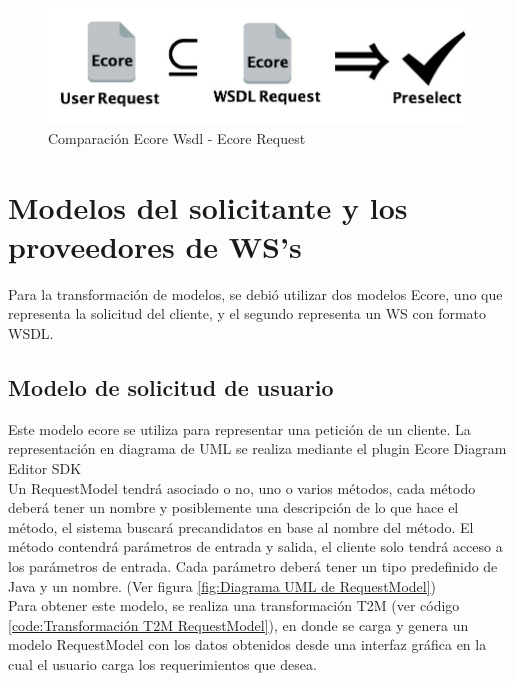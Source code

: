 \begin{figure}[!h] 
	\begin{center}
		\includegraphics [scale=0.45]{imagenes/Comparacion_Ecore_Wsdl.jpg}
	\end{center}
	\caption{Comparación Ecore Wsdl - Ecore Request}
	\label{fig:Comparación Ecore Wsdl - Ecore Request}
\end{figure} 

\section{Modelos del solicitante y los proveedores de WS's}
\label{Modelos del solicitante y los proveedores de WS's}

Para la transformación de modelos, se debió utilizar dos modelos Ecore, uno que representa la solicitud del cliente, y el segundo representa un WS con formato WSDL.

\subsection{Modelo de solicitud de usuario}
\label{Modelo de solicitud de usuario}

Este modelo ecore se utiliza para representar una petición  de un cliente. La representación en diagrama de UML se realiza mediante el plugin Ecore Diagram Editor SDK\\

Un RequestModel tendrá asociado o no, uno o varios métodos, cada método deberá tener un nombre y posiblemente una descripción de lo que hace el método, el sistema buscará precandidatos en base al nombre del método. El método contendrá parámetros de entrada y salida, el cliente solo tendrá acceso a los parámetros de entrada. Cada parámetro deberá tener un tipo predefinido de Java y un nombre. (Ver figura \ref{fig:Diagrama UML de RequestModel})\\

Para obtener este modelo, se realiza una transformación T2M (ver código \ref{code:Transformación T2M RequestModel}), en donde se carga y genera un modelo RequestModel con los datos obtenidos desde una interfaz gráfica en la cual el usuario carga los requerimientos que desea.\\

